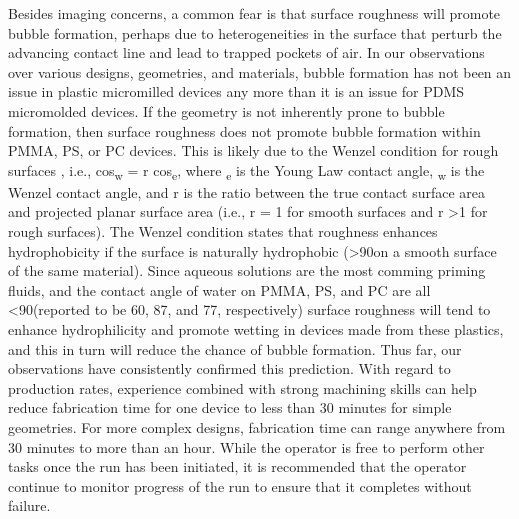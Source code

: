 Besides imaging concerns, a common fear is that surface roughness will promote bubble formation, perhaps due to heterogeneities in the surface that perturb the advancing contact line and lead to trapped pockets of air. In our observations over various designs, geometries, and materials, bubble formation has not been an issue in plastic micromilled devices any more than it is an issue for PDMS micromolded devices. If the geometry is not inherently prone to bubble formation, then surface roughness does not promote bubble formation within PMMA, PS, or PC devices. This is likely due to the Wenzel condition for rough surfaces \cite{Wenzel2002RESISTANCEWATER,Ouali2013}, i.e., cos\texttheta\textsubscript{w} = r cos\texttheta\textsubscript{e}, where \texttheta\textsubscript{e} is the Young Law contact angle, \texttheta\textsubscript{w} is the Wenzel contact angle, and r is the ratio between the true contact surface area and projected planar surface area (i.e., r = 1 for smooth surfaces and r \textgreater 1 for rough surfaces). The Wenzel condition states that roughness enhances hydrophobicity if the surface is naturally hydrophobic (\texttheta\textgreater90\textdegree on a smooth surface of the same material). Since aqueous solutions are the most comming priming fluids, and the contact angle of water on PMMA, PS, and PC are all \textless 90\textdegree (reported to be 60\textdegree, 87\textdegree, and 77\textdegree, respectively)\cite{Montez2011} surface roughness will tend to enhance hydrophilicity and promote wetting in devices made from these plastics, and this in turn will reduce the chance of bubble formation. Thus far, our observations have consistently confirmed this prediction.
With regard to production rates, experience combined with strong machining skills can help reduce fabrication time for one device to less than 30 minutes for simple geometries. For more complex designs, fabrication time can range anywhere from 30 minutes to more than an hour. While the operator is free to perform other tasks once the run has been initiated, it is recommended that the operator continue to monitor progress of the run to ensure that it completes without failure.
